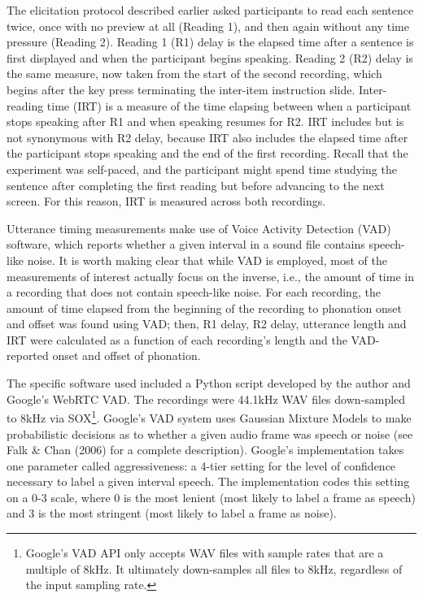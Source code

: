 \documentclass[11pt,oneside]{book}
\let\rmarkdownfootnote\footnote%
\def\footnote{\protect\rmarkdownfootnote}
\begin{document}
The elicitation protocol described earlier asked participants to read each sentence twice, once with no preview at all (Reading 1), and then again without any time pressure (Reading 2). Reading 1 (R1) delay is the elapsed time after a sentence is first displayed and when the participant begins speaking. Reading 2 (R2) delay is the same measure, now taken from the start of the second recording, which begins after the key press terminating the inter-item instruction slide. Inter-reading time (IRT) is a measure of the time elapsing between when a participant stops speaking after R1 and when speaking resumes for R2. IRT includes but is not synonymous with R2 delay, because IRT also includes the elapsed time after the participant stops speaking and the end of the first recording. Recall that the experiment was self-paced, and the participant might spend time studying the sentence after completing the first reading but before advancing to the next screen. For this reason, IRT is measured across both recordings.

Utterance timing measurements make use of Voice Activity Detection (VAD) software, which reports whether a given interval in a sound file contains speech-like noise. It is worth making clear that while VAD is employed, most of the measurements of interest actually focus on the inverse, i.e., the amount of time in a recording that does not contain speech-like noise. For each recording, the amount of time elapsed from the beginning of the recording to phonation onset and offset was found using VAD; then, R1 delay, R2 delay, utterance length and IRT were calculated as a function of each recording's length and the VAD-reported onset and offset of phonation.

The specific software used included a Python script developed by the author and Google's WebRTC VAD. The recordings were 44.1kHz WAV files down-sampled to 8kHz via SOX\footnote{Google's VAD API only accepts WAV files with sample rates that are a multiple of 8kHz. It ultimately down-samples all files to 8kHz, regardless of the input sampling rate.}. Google's VAD system uses Gaussian Mixture Models to make probabilistic decisions as to whether a given audio frame was speech or noise (see Falk \& Chan (2006) for a complete description). Google's implementation takes one parameter called aggressiveness: a 4-tier setting for the level of confidence necessary to label a given interval speech. The implementation codes this setting on a 0-3 scale, where 0 is the most lenient (most likely to label a frame as speech) and 3 is the most stringent (most likely to label a frame as noise).
\end{document}
